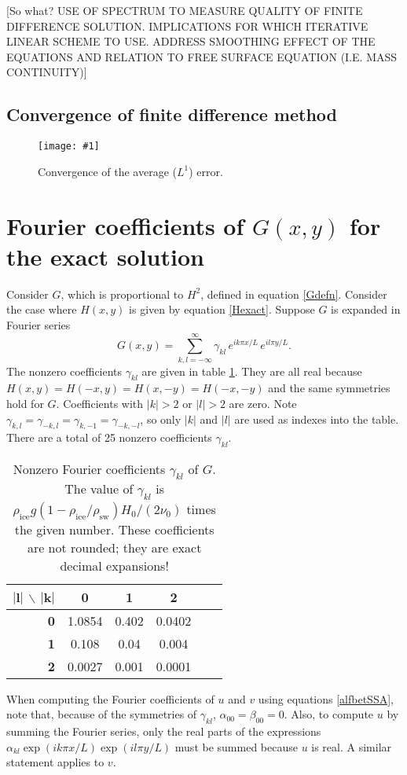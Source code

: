 \documentclass[12pt]{amsart}%
\theoremstyle{plain}
\theoremstyle{definition}
\newcommand{\regfigure}[2]{\texttt{[image: \#1]}}
\begin{document}
[So what?  USE OF SPECTRUM TO MEASURE QUALITY OF FINITE DIFFERENCE SOLUTION.  IMPLICATIONS FOR WHICH ITERATIVE LINEAR SCHEME TO USE.  ADDRESS SMOOTHING EFFECT OF THE EQUATIONS AND RELATION TO FREE SURFACE EQUATION (I.E. MASS CONTINUITY)]

\subsection{Convergence of finite difference method}


\begin{figure}[ht]
\regfigure{testJPISMaverr}{3.0}
\caption{Convergence of the average ($L^1$) error.}
\label{fig:averr}
\end{figure}



\small



\appendix
\section{Fourier coefficients of $G(x,y)$ for the exact solution} Consider $G$, which is proportional to $H^2$, defined in equation \eqref{Gdefn}.  Consider the case where $H(x,y)$ is given by equation \eqref{Hexact}.  Suppose $G$ is expanded in Fourier series
\begin{equation*}
G(x,y) = \sum_{k,l = -\infty}^\infty \gamma_{kl}\, e^{i k \pi x/L}\,e^{i l \pi y/L}.
\end{equation*}
The nonzero coefficients $\gamma_{kl}$ are given in table \ref{tab:coeffs}.  They are all real because $H(x,y) = H(-x,y) = H(x,-y) = H(-x,-y)$ and the same symmetries hold for $G$.  Coefficients with $|k|>2$ or $|l|>2$ are zero. Note $\gamma_{k,l} = \gamma_{-k,l} = \gamma_{k,-1} = \gamma_{-k,-l}$, so only $|k|$ and $|l|$ are used as indexes into the table.  There are a total of 25 nonzero coefficients $\gamma_{kl}$.

\begin{table}[h] \small
\caption{Nonzero Fourier coefficients $\gamma_{kl}$ of $G$.  The value of $\gamma_{kl}$ is $\rho_{\text{ice}} g (1 - \rho_{\text{ice}}/\rho_{\text{sw}}) H_0 / (2 \nu_0)$ times the given number.  These coefficients are not rounded; they are exact decimal expansions!}\label{tab:coeffs}
\begin{tabular}{r|c|c|c|c|c}
$\mathbf{|l|}$ \Large $\backslash$ \normalsize $\mathbf{|k|}$ & \textbf{0} & \textbf{1} & \textbf{2} \\ \hline
\textbf{0} & 1.0854 & 0.402 & 0.0402 \\ \hline
\textbf{1} & 0.108 & 0.04 & 0.004 \\ \hline
\textbf{2} & 0.0027 & 0.001 & 0.0001
\normalsize
\end{tabular}
\end{table}

When computing the Fourier coefficients of $u$ and $v$ using equations \eqref{alfbetSSA}, note that, because of the symmetries of $\gamma_{kl}$, $\alpha_{00} = \beta_{00} = 0$.  Also, to compute $u$ by summing the Fourier series, only the real parts of the expressions $\alpha_{kl} \exp(i k \pi x/L) \exp(i l \pi y/L)$ must be summed because $u$ is real.  A similar statement applies to $v$.
\end{document}
